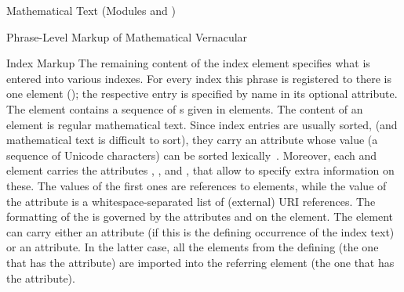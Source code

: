 \begin{tchapter}[id=mtxt,short=Mathematical Text]{Mathematical Text (Modules
  {} and {})}
\begin{tsection}[id=phrases]{Phrase-Level Markup of Mathematical Vernacular}
\begin{tsubsection}{Index Markup}
The remaining content of the index element specifies what is entered into various
indexes. For every index this phrase is registered to there is one {} element
({}); the respective entry is specified by name in its optional
{} attribute. The {} element contains a sequence of
{s} given in {} elements. The content of an
{} element is regular mathematical text. Since index entries are usually
sorted, (and mathematical text is difficult to sort), they carry an attribute
{} whose value (a sequence of Unicode characters) can be sorted
lexically~\cite{Unicode:collation}. Moreover, each {} and {}
element carries the attributes {}, {},
and {}, that allow to specify extra information on these. The
values of the first ones are references to {} elements, while the value of
the {} attribute is a whitespace-separated list of (external) URI
references.  The formatting of the {} is governed by the attributes
{} and {} on the {} element. The
{} element can carry either an {} attribute
(if this is the defining occurrence of the index text) or an {}
attribute. In the latter case, all the {} elements from the defining
{} (the one that has the {} attribute) are
imported into the referring {} element (the one that has the
{} attribute).
\end{tsubsection}


\end{tsection}
\end{tchapter}
